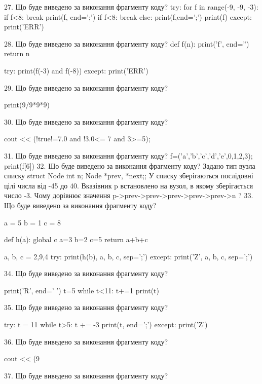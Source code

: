 \documentclass[11pt]{article}
\begin{document}
27. Що буде виведено за виконання фрагменту коду?
try:
    for f in range(-9, -9, -3):
        if f<8:
            break
        print(f, end=';')
        if f<8:
            break
    else:
        print(f,end=';')
    print(f)
except:
    print('ERR')

28. Що буде виведено за виконання фрагменту коду?
def f(n):
    print('f', end='')
    return n

try:
    print(f(-3) and f(-8))
except:
    print('ERR')

29. Що буде виведено за виконання фрагменту коду?

print(9/9*9*9)

30. Що буде виведено за виконання фрагменту коду?

cout << (!true!=7.0 and !3.0<= 7 and 3>=5);

31. Що буде виведено за виконання фрагменту коду?
f=('a','b','c','d','e',0,1,2,3); print(f[6])
32. Що буде виведено за виконання фрагменту коду?
Задано тип вузла списку struct Node {int n; Node *prev, *next;};
У списку зберігаються послідовні цілі числа від -45 до 40. Вказівник p встановлено на вузол, в якому зберігається число -3.
Чому дорівнює значення p->prev->prev->prev->prev->prev->n ?
33. Що буде виведено за виконання фрагменту коду?

a = 5
b = 1
c = 8

def h(a):
global c    a=3
    b=2
    c=5
    return a+b+c

a, b, c = 2,9,4
try:
    print(h(b), a, b, c, sep=';')
except:
    print('Z', a, b, c, sep=';')

34. Що буде виведено за виконання фрагменту коду?

print('R', end=' ')
t=5
while t<11:
    t+=1
print(t)


35. Що буде виведено за виконання фрагменту коду?

try:
    t = 11
    while t>5:
        t += -3
    print(t, end=';')
except:
    print('Z')


36. Що буде виведено за виконання фрагменту коду?

cout << (9 %

37. Що буде виведено за виконання фрагменту коду?
\end{document}
